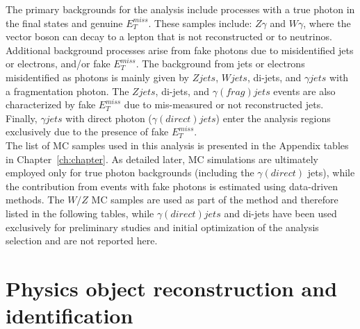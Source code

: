The primary backgrounds for the analysis include processes with a true photon in the final states and genuine $E_{T}^{miss}$. These samples include: $Z\gamma$ and $W\gamma$, where the vector boson can decay to a lepton that is not reconstructed or to neutrinos.
Additional background processes arise from fake photons due to misidentified jets or electrons, and/or fake $E_{T}^{miss}$. 
The background from jets or electrons misidentified as photons is mainly given by $Zjets$, $Wjets$, di-jets, and $\gamma jets$ with a fragmentation photon. The $Zjets$, di-jets, and $\gamma(frag) jets$ events are also characterized by fake $E_{T}^{miss}$ due to mis-measured or not reconstructed jets. Finally, $\gamma jets$ with direct photon ($\gamma (direct)jets$) enter the analysis regions exclusively due to the presence of fake $E_{T}^{miss}$. \\
The list of MC samples used in this analysis is presented in the Appendix tables in Chapter~\ref{ch:chapter}. As detailed later, MC simulations are ultimately employed only for true photon backgrounds (including the $\gamma(direct) $ jets), while the contribution from events with fake photons is estimated using data-driven methods. The $W/Z$ MC samples are used as part of the \jfakey method and therefore listed in the following tables, while $\gamma(direct) jets$ and di-jets have been used exclusively for preliminary studies and initial optimization of the analysis selection and are not reported here.  




\FloatBarrier
\section{Physics object reconstruction and identification}

